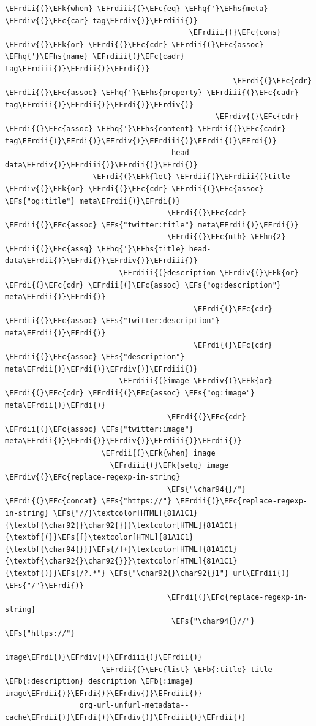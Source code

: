 \documentclass{scrartcl}
\newcommand{\EFk}[1]{\textcolor{EFk}{#1}} %
\newcommand{\EFs}[1]{\textcolor{EFs}{#1}} %
\newcommand{\EFb}[1]{\textcolor{EFb}{#1}} %
\newcommand{\EFc}[1]{\textcolor{EFc}{#1}} %
\newcommand{\EFhn}[1]{#1} %
\newcommand{\EFhq}[1]{#1} %
\newcommand{\EFhs}[1]{#1} %
\newcommand{\EFrdi}[1]{#1} %
\newcommand{\EFrdii}[1]{#1} %
\newcommand{\EFrdiii}[1]{#1} %
\newcommand{\EFrdiv}[1]{#1} %
\begin{document}
\begin{Code}
\begin{Verbatim}[]
                                        \EFrdii{(}\EFk{when} \EFrdiii{(}\EFc{eq} \EFhq{'}\EFhs{meta} \EFrdiv{(}\EFc{car} tag\EFrdiv{)}\EFrdiii{)}
                                          \EFrdiii{(}\EFc{cons} \EFrdiv{(}\EFk{or} \EFrdi{(}\EFc{cdr} \EFrdii{(}\EFc{assoc} \EFhq{'}\EFhs{name} \EFrdiii{(}\EFc{cadr} tag\EFrdiii{)}\EFrdii{)}\EFrdi{)}
                                                    \EFrdi{(}\EFc{cdr} \EFrdii{(}\EFc{assoc} \EFhq{'}\EFhs{property} \EFrdiii{(}\EFc{cadr} tag\EFrdiii{)}\EFrdii{)}\EFrdi{)}\EFrdiv{)}
                                                \EFrdiv{(}\EFc{cdr} \EFrdi{(}\EFc{assoc} \EFhq{'}\EFhs{content} \EFrdii{(}\EFc{cadr} tag\EFrdii{)}\EFrdi{)}\EFrdiv{)}\EFrdiii{)}\EFrdii{)}\EFrdi{)}
                                      head-data\EFrdiv{)}\EFrdiii{)}\EFrdii{)}\EFrdi{)}
                    \EFrdi{(}\EFk{let} \EFrdii{(}\EFrdiii{(}title \EFrdiv{(}\EFk{or} \EFrdi{(}\EFc{cdr} \EFrdii{(}\EFc{assoc} \EFs{"og:title"} meta\EFrdii{)}\EFrdi{)}
                                     \EFrdi{(}\EFc{cdr} \EFrdii{(}\EFc{assoc} \EFs{"twitter:title"} meta\EFrdii{)}\EFrdi{)}
                                     \EFrdi{(}\EFc{nth} \EFhn{2} \EFrdii{(}\EFc{assq} \EFhq{'}\EFhs{title} head-data\EFrdii{)}\EFrdi{)}\EFrdiv{)}\EFrdiii{)}
                          \EFrdiii{(}description \EFrdiv{(}\EFk{or} \EFrdi{(}\EFc{cdr} \EFrdii{(}\EFc{assoc} \EFs{"og:description"} meta\EFrdii{)}\EFrdi{)}
                                           \EFrdi{(}\EFc{cdr} \EFrdii{(}\EFc{assoc} \EFs{"twitter:description"} meta\EFrdii{)}\EFrdi{)}
                                           \EFrdi{(}\EFc{cdr} \EFrdii{(}\EFc{assoc} \EFs{"description"} meta\EFrdii{)}\EFrdi{)}\EFrdiv{)}\EFrdiii{)}
                          \EFrdiii{(}image \EFrdiv{(}\EFk{or} \EFrdi{(}\EFc{cdr} \EFrdii{(}\EFc{assoc} \EFs{"og:image"} meta\EFrdii{)}\EFrdi{)}
                                     \EFrdi{(}\EFc{cdr} \EFrdii{(}\EFc{assoc} \EFs{"twitter:image"} meta\EFrdii{)}\EFrdi{)}\EFrdiv{)}\EFrdiii{)}\EFrdii{)}
                      \EFrdii{(}\EFk{when} image
                        \EFrdiii{(}\EFk{setq} image \EFrdiv{(}\EFc{replace-regexp-in-string}
                                     \EFs{"\char94{}/"} \EFrdi{(}\EFc{concat} \EFs{"https://"} \EFrdii{(}\EFc{replace-regexp-in-string} \EFs{"//}\textcolor[HTML]{81A1C1}{\textbf{\char92{}\char92{}}}\textcolor[HTML]{81A1C1}{\textbf{(}}\EFs{[}\textcolor[HTML]{81A1C1}{\textbf{\char94{}}}\EFs{/]+}\textcolor[HTML]{81A1C1}{\textbf{\char92{}\char92{}}}\textcolor[HTML]{81A1C1}{\textbf{)}}\EFs{/?.*"} \EFs{"\char92{}\char92{}1"} url\EFrdii{)} \EFs{"/"}\EFrdi{)}
                                     \EFrdi{(}\EFc{replace-regexp-in-string}
                                      \EFs{"\char94{}//"} \EFs{"https://"}
                                      image\EFrdi{)}\EFrdiv{)}\EFrdiii{)}\EFrdii{)}
                      \EFrdii{(}\EFc{list} \EFb{:title} title \EFb{:description} description \EFb{:image} image\EFrdii{)}\EFrdi{)}\EFrdiv{)}\EFrdiii{)}
                 org-url-unfurl-metadata--cache\EFrdii{)}\EFrdi{)}\EFrdiv{)}\EFrdiii{)}\EFrdii{)}


\end{Verbatim}
\end{Code}
\end{document}
